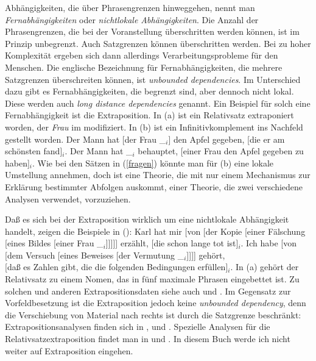 Abhängigkeiten, die über Phrasengrenzen hinweggehen, nennt man
\emph{Fernabhängigkeiten} oder \emph{nichtlokale Abhängigkeiten}. Die Anzahl der Phrasengrenzen, die bei der Voranstellung überschritten werden können, ist im Prinzip
unbegrenzt. Auch Satzgrenzen können überschritten werden. Bei zu hoher Komplexität ergeben sich
dann allerdings Verarbeitungsprobleme für den Menschen. 
Die englische Bezeichnung für Fernabhängigkeiten, die mehrere Satzgrenzen überschreiten können,
ist \emph{unbounded dependencies}. Im Unterschied dazu gibt es Fernabhängigkeiten, die
begrenzt sind, aber dennoch nicht lokal. Diese werden auch \emph{long distance dependencies}
genannt. Ein Beispiel für solch eine Fernabhängigkeit ist die Extraposition.
In (a) ist ein Relativsatz extraponiert worden, der \emph{Frau} im \mf modifiziert.
In (b) ist ein Infinitivkomplement ins Nachfeld gestellt worden. 
\eal
\label{bsp-extrap}
\ex Der Mann hat [der Frau \_$_i$] den Apfel gegeben, [die er am schönsten fand]$_i$.
\ex Der Mann hat \_$_i$ behauptet, [einer Frau den Apfel gegeben zu haben]$_i$.
\zl
Wie bei den Sätzen
in (\ref{fragen}) könnte man für (b) eine lokale Umstellung annehmen, doch ist eine
Theorie, die mit nur einem Mechanismus zur Erklärung bestimmter Abfolgen auskommt, einer
Theorie, die zwei verschiedene Analysen verwendet, vorzuziehen.

Daß es sich bei der Extraposition wirklich um eine nichtlokale Abhängigkeit handelt,
zeigen die Beispiele in ():
\eal
\ex Karl hat mir [von [der Kopie [einer Fälschung [eines Bildes [einer Frau \_$_i$]]]]] erzählt,
    [die schon lange tot ist]$_i$.
\ex Ich habe [von [dem Versuch [eines Beweises [der Vermutung \_$_i$]]]] gehört,\\
       {}[daß es Zahlen gibt, die die folgenden Bedingungen erfüllen]$_i$.
\zl
In (a) gehört der Relativsatz zu einem Nomen, das in fünf maximale Phrasen eingebettet
ist. Zu solchen und anderen Extrapositionsdaten siehe auch 
und . Im Gegensatz zur Vorfeldbesetzung ist die Extraposition jedoch keine
\emph{unbounded dependency}, denn die Verschiebung von Material nach rechts ist durch die Satzgrenze
beschränkt:
\eal
{}
\zl
Extrapositionsanalysen finden sich in \citealp{Keller95b}, \citealp{Bouma96} und
\citealp[Kapitel~13.2]{Mueller99a}. Spezielle Analysen für die Relativsatzextraposition findet man in
 und . In diesem Buch werde ich nicht weiter auf Extraposition
eingehen.

